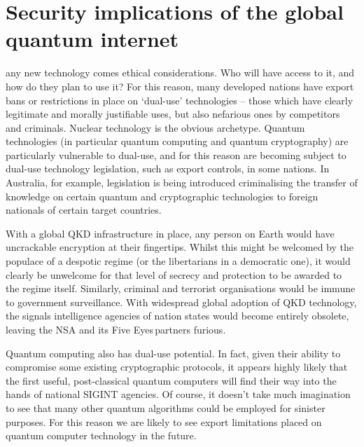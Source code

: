 %
%

\section{Security implications of the global quantum internet} \label{sec:sec_imp} 

 any new technology comes ethical considerations. Who will have access to it, and how do they plan to use it? For this reason, many developed nations have export bans or restrictions in place on `dual-use' technologies -- those which have clearly legitimate and morally justifiable uses, but also nefarious ones by competitors and criminals. Nuclear technology is the obvious archetype. Quantum technologies (in particular quantum computing and quantum cryptography) are particularly vulnerable to dual-use, and for this reason are becoming subject to dual-use technology legislation, such as export controls, in some nations. In Australia, for example, legislation is being introduced criminalising the transfer of knowledge on certain quantum and cryptographic technologies to foreign nationals of certain target countries.

With a global QKD infrastructure in place, any person on Earth would have uncrackable encryption at their fingertips. Whilst this might be welcomed by the populace of a despotic regime (or the libertarians in a democratic one), it would clearly be unwelcome for that level of secrecy and protection to be awarded to the regime itself. Similarly, criminal and terrorist organisations would be immune to government surveillance. With widespread global adoption of QKD technology, the signals intelligence agencies of nation states would become entirely obsolete, leaving the NSA and its Five Eyes\texttrademark\,partners furious.

Quantum computing also has dual-use potential. In fact, given their ability to compromise some existing cryptographic protocols, it appears highly likely that the first useful, post-classical quantum computers will find their way into the hands of national SIGINT agencies. Of course, it doesn't take much imagination to see that many other quantum algorithms could be employed for sinister purposes. For this reason we are likely to see export limitations placed on quantum computer technology in the future.

